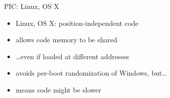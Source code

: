 \begin{frame}{PIC: Linux, OS X}
    \begin{itemize}
        \item Linux, OS X: position-independent code
        \item allows code memory to be shared
        \item \ldots even if loaded at different addresses
        \vspace{.5cm}
        \item avoids per-boot randomization of Windows, but\ldots
        \item means code might be slower
    \end{itemize}
\end{frame}
